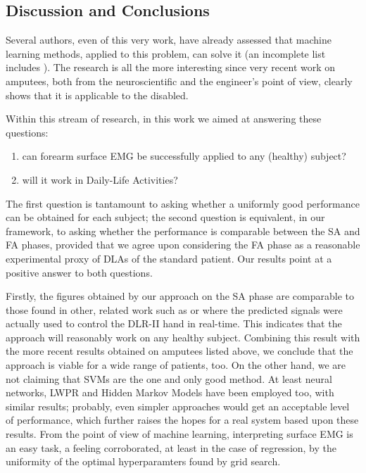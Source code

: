 \documentclass[10pt]{bmc_article}
\newenvironment{bmcformat}{\begin{raggedright}\baselineskip20pt\sloppy\setboolean{publ}{false}}{\end{raggedright}\baselineskip20pt\sloppy}
\begin{document}
\begin{bmcformat}
\section*{Discussion and Conclusions}
\label{sec:discussion}

Several authors, even of this very work, have already assessed that
machine learning methods, applied to this problem, can solve it (an
incomplete list includes
\cite{chan2005,tsukamoto,englehart08,cipriani,2008.BioCyb}). The
research is all the more interesting since very recent work on
amputees, both from the neuroscientific \cite{pascual,sirigu1,sirigu2}
and the engineer's \cite{sebelius,2009.JPP,ramos}
point of view, clearly shows that it is applicable to the disabled.

Within this stream of research, in this work we aimed at answering
these questions:

\begin{enumerate}

  \item can forearm surface EMG be successfully applied to any (healthy) subject?

  \item will it work in Daily-Life Activities?

\end{enumerate}

The first question is tantamount to asking whether a uniformly good
performance can be obtained for each subject; the second question is
equivalent, in our framework, to asking whether the performance is
comparable between the SA and FA phases, provided that we agree upon
considering the FA phase as a reasonable experimental proxy of DLAs
of the standard patient. Our results point at a positive answer to
both questions.

Firstly, the figures obtained by our approach on the SA phase are
comparable to those found in other, related work such as
\cite{ramos,cipriani} or \cite{2008.BioCyb} where the predicted signals
were actually used to control the DLR-II hand in real-time. This
indicates that the approach will reasonably work on any healthy subject.
Combining this result with the more recent results obtained on amputees
listed above, we conclude that the approach is viable for a wide range
of patients, too. On the other hand, we are not claiming that SVMs are the one and only
good method. At least neural networks, LWPR \cite{lwpr} and Hidden Markov
Models \cite{chan2005} have been employed too, with similar results; probably,
even simpler approaches would get an acceptable level of performance,
which further raises the hopes for a real system based upon these
results. From the point of view of machine learning, interpreting surface
EMG is an easy task, a feeling corroborated, at least in the case of
regression, by the uniformity of the optimal hyperparamters found by
grid search.


\end{bmcformat}
\end{document}
